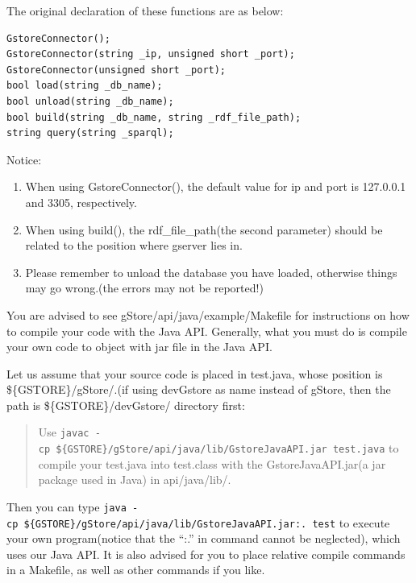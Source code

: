 \documentclass[titlepage, a4paper, 12pt]{article}
\begin{document}
The original declaration of these functions are as below:

\begin{verbatim}
GstoreConnector();
GstoreConnector(string _ip, unsigned short _port);
GstoreConnector(unsigned short _port);
bool load(string _db_name);
bool unload(string _db_name);
bool build(string _db_name, string _rdf_file_path);
string query(string _sparql);
\end{verbatim}

Notice:

\begin{enumerate}
\item
  When using GstoreConnector(), the default value for ip and port is
  127.0.0.1 and 3305, respectively.
\item
  When using build(), the rdf\_file\_path(the second parameter) should
  be related to the position where gserver lies in.
\item
  Please remember to unload the database you have loaded, otherwise
  things may go wrong.(the errors may not be reported!)
\end{enumerate}


You are advised to see gStore/api/java/example/Makefile for instructions on how to compile your code with the Java API. Generally, what you must do is compile your own code to object with jar file in the Java API.

Let us assume that your source code is placed in test.java, whose position is \$\{GSTORE\}/gStore/.(if using devGstore as name instead of gStore, then the path is \$\{GSTORE\}/devGstore/ directory first:

\begin{quote}
Use \texttt{javac\ -cp\ \$\{GSTORE\}/gStore/api/java/lib/GstoreJavaAPI.jar\ test.java} to compile your test.java into test.class with the GstoreJavaAPI.jar(a jar package used in Java) in api/java/lib/.
\end{quote}

Then you can type \texttt{java\ -cp\ \$\{GSTORE\}/gStore/api/java/lib/GstoreJavaAPI.jar:.\ test} to execute your own program(notice that the ``:.'' in command cannot be neglected), which uses our Java API. It is also advised for you to place relative compile commands in a Makefile, as well as other commands if you like.
\end{document}
